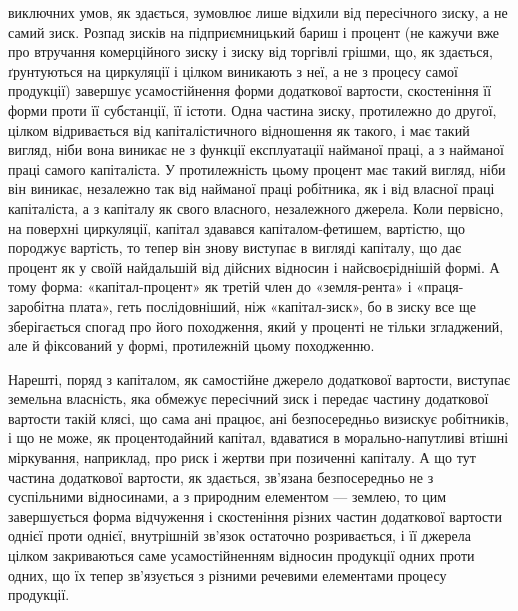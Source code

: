 виключних умов, як здається, зумовлює лише відхили від пересічного зиску,
а не самий зиск. Розпад зисків на підприємницький бариш і процент (не кажучи
вже про втручання комерційного зиску і зиску від торгівлі грішми, що, як
здається, ґрунтуються на циркуляції і цілком виникають з неї, а не з процесу
самої продукції) завершує усамостійнення форми додаткової вартости, скостеніння
її форми проти її субстанції, її істоти. Одна частина зиску, протилежно до
другої, цілком відривається від капіталістичного відношення як такого, і має
такий вигляд, ніби вона виникає не з функції експлуатації найманої праці,
а з найманої праці самого капіталіста. У протилежність цьому процент має
такий вигляд, ніби він виникає, незалежно так від найманої праці робітника,
як і від власної праці капіталіста, а з капіталу як свого власного, незалежного
джерела. Коли первісно, на поверхні циркуляції, капітал здавався капіталом-фетишем,
вартістю, що породжує вартість, то тепер він знову виступає в вигляді
капіталу, що дає процент як у своїй найдальшій від дійсних відносин і
найсвоєріднішій формі. А тому форма: «капітал-процент» як третій член до
«земля-рента» і «праця-заробітна плата», геть послідовніший, ніж «капітал-зиск»,
бо в зиску все ще зберігається спогад про його походження, який у проценті
не тільки згладжений, але й фіксований у формі, протилежній цьому
походженню.

Нарешті, поряд з капіталом, як самостійне джерело додаткової вартости,
виступає земельна власність, яка обмежує пересічний зиск і передає частину
додаткової вартости такій клясі, що сама ані працює, ані безпосередньо визискує
робітників, і що не може, як процентодайний капітал, вдаватися в морально-напутливі
втішні міркування, наприклад, про риск і жертви при позиченні
капіталу. А що тут частина додаткової вартости, як здається, зв’язана безпосередньо
не з суспільними відносинами, а з природним елементом — землею, то цим
завершується форма відчуження і скостеніння різних частин додаткової вартости
однієї проти однієї, внутрішній зв’язок остаточно розривається, і її джерела
цілком закриваються саме усамостійненням відносин продукції одних проти одних,
що їх тепер зв’язується з різними речевими елементами процесу продукції.

